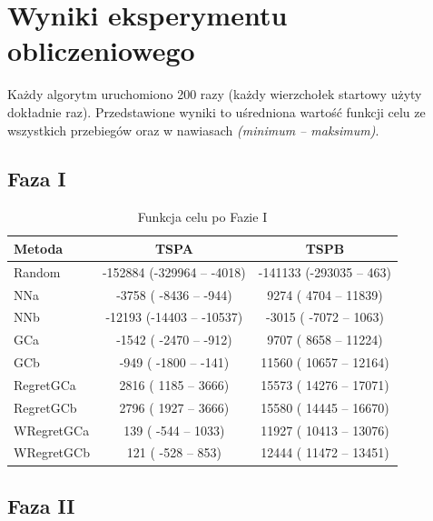 \documentclass[11pt,a4paper]{article}
\begin{document}
\section{Wyniki eksperymentu obliczeniowego}

Każdy algorytm uruchomiono 200 razy (każdy wierzchołek startowy użyty dokładnie raz). Przedstawione wyniki to uśredniona wartość funkcji celu ze wszystkich przebiegów oraz w nawiasach \textit{(minimum -- maksimum)}.

\subsection{Faza I}

\begin{table}[H]
\centering
\caption{Funkcja celu po Fazie I}
\begin{tabular}{lcc}
\toprule
\textbf{Metoda} & \textbf{TSPA} & \textbf{TSPB} \\
\midrule
Random                 & -152884 (-329964 --   -4018) & -141133 (-293035 --     463) \\
NNa       &   -3758 (  -8436 --    -944) &    9274 (   4704 --   11839) \\
NNb        &  -12193 (-14403 --  -10537) &   -3015 (  -7072 --    1063) \\
GCa       &   -1542 (  -2470 --    -912) &    9707 (   8658 --   11224) \\
GCb      &    -949 (  -1800 --    -141) &   11560 (  10657 --   12164) \\
RegretGCa  &    2816 (   1185 --    3666) &   15573 (  14276 --   17071) \\
RegretGCb  &    2796 (   1927 --    3666) &   15580 (  14445 --   16670) \\
WRegretGCa &     139 (   -544 --    1033) &   11927 (  10413 --   13076) \\
WRegretGCb &     121 (   -528 --     853) &   12444 (  11472 --   13451) \\
\bottomrule
\end{tabular}
\end{table}

\subsection{Faza II}
\end{document}

